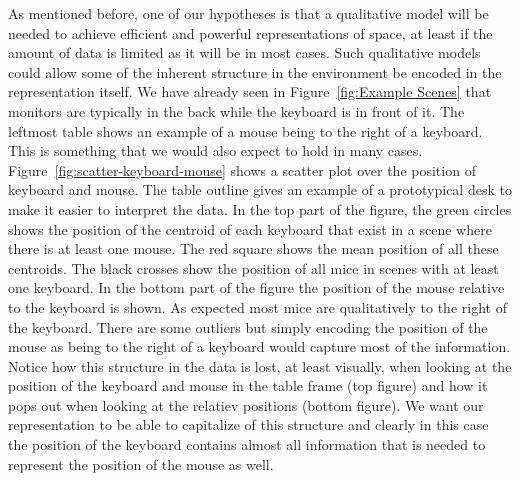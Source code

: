 \documentclass[letterpaper, 10 pt, conference]{ieeeconf}  %
\begin{document}
As mentioned before, one of our hypotheses is that a qualitative model will be needed to achieve efficient and powerful representations of 
space, at least if the amount of data is limited as it will be in most cases. Such qualitative models could allow some of the inherent 
structure in the environment be encoded in the representation itself. We have already seen in Figure~\ref{fig:Example Scenes} that monitors 
are typically in the back while the keyboard is in front of it. The leftmost table shows an example of a mouse being to the right of a 
keyboard. This is something that we would also expect to hold in many cases. Figure~\ref{fig:scatter-keyboard-mouse} shows a scatter plot 
over the position of keyboard and mouse. The table outline gives an example of a prototypical desk to make it easier to interpret the data. 
In the top part of the figure, the green circles shows the position of the centroid of each 
keyboard that exist in a scene where there is at least one mouse. The red square shows the mean position of all these centroids. The black 
crosses show the position of all mice in scenes with at least one keyboard. In the bottom part of the figure the position of the mouse 
relative to the keyboard is shown. As expected most mice are qualitatively to the right of the keyboard. There are some outliers but simply 
encoding the position of the mouse as being to the right of a keyboard would capture most of the information. Notice how this structure in the data is lost, at least visually, when looking at the position of the keyboard and mouse in the table frame (top figure) and how it pops out when looking at the relatiev positions (bottom figure). We want our representation to be able to capitalize of this structure and clearly in this case the position of the keyboard contains almost all information that is needed to represent the position of the mouse as well.
\end{document}
